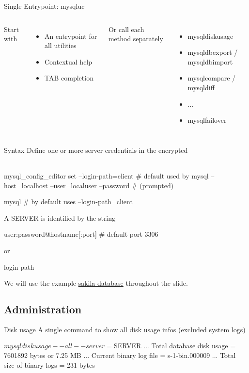 \documentclass{beamer}[10]
\begin{document}
\begin{pyframe}{Single Entrypoint: mysqluc}
\begin{columns}
    Start with 
    \begin{itemize}
    \item An entrypoint for all utilities
    \item Contextual help
    \item TAB completion
    \end{itemize}

    Or call each method separately
    \begin{itemize}
    \item mysqldiskusage
    \item mysqldbexport / mysqldbimport
    \item mysqlcompare / mysqldiff
    \item ...
    \item mysqlfailover
    \end{itemize}
\end{columns}
\end{pyframe}


\begin{pyframe}{Syntax}
Define one or more server credentials in the encrypted \\ \\
\begin{bashcode}
    mysql_config_editor set
        --login-path=client # default used by mysql
        --host=localhost --user=localuser
        --password # (prompted)

    mysql # by default uses --login-path=client
\end{bashcode}

A SERVER is identified by the string
\begin{bashcode}
    user:password@hostname[:port] # default port 3306
\end{bashcode}
or
\begin{bashcode}
    login-path
\end{bashcode}
We will use the example \href{http://dev.mysql.com/doc/index-other.html}
{sakila database} throughout the slide.

\end{pyframe}


\subsection{Administration}
\begin{pyframe}{Disk usage}
A single command to show all disk usage infos (excluded system logs)

\begin{bashcode}
$ mysqldiskusage --all --server=$SERVER %
...
Total database disk usage = 7601892 bytes or 7.25 MB
...
Current binary log file = s-1-bin.000009
...
Total size of binary logs = 231 bytes
\end{bashcode}
\end{pyframe}
\end{document}
